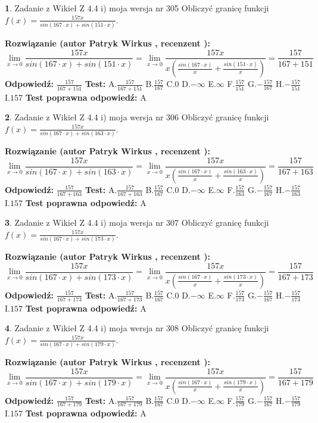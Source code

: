 \documentclass[12pt, a4paper]{article}
\theoremstyle{definition} %
\newtheorem{zad}{}
\newcommand{\zadStart}[1]{\begin{zad}#1\newline}
\newcommand{\zadStop}{\end{zad}}
\newcommand{\rozwStart}[2]{\noindent \textbf{Rozwiązanie (autor #1 , recenzent #2): }\newline}
\newcommand{\rozwStop}{\newline}
\newcommand{\odpStart}{\noindent \textbf{Odpowiedź:}\newline}
\newcommand{\odpStop}{\newline}
\newcommand{\testStart}{\noindent \textbf{Test:}\newline}
\newcommand{\testStop}{\newline}
\newcommand{\kluczStart}{\noindent \textbf{Test poprawna odpowiedź:}\newline}
\newcommand{\kluczStop}{\newline}
\begin{document}
\zadStart{Zadanie z Wikieł Z 4.4 i) moja wersja nr 305}
Obliczyć granicę funkcji $f(x)=\frac{157x}{sin(167\cdot x) +sin(151\cdot x)}$.
\zadStop
\rozwStart{Patryk Wirkus}{}
$$\lim\limits_{x\to 0}\frac{157x}{sin(167\cdot x) +sin(151\cdot x)}=\lim\limits_{x\to 0}\frac{157x}{x(\frac{sin(167\cdot x)}{x}+\frac{sin(151\cdot x)}{x})}=\frac{157}{167+151}$$
\rozwStop
\odpStart
$\frac{157}{167+151}$
\odpStop
\testStart
A.$\frac{157}{167+151}$
B.$\frac{157}{167}$
C.$0$
D.$-\infty$
E.$\infty$
F.$\frac{157}{151}$
G.$-\frac{157}{167}$
H.$-\frac{157}{151}$
I.$157$
\testStop
\kluczStart
A
\kluczStop



\zadStart{Zadanie z Wikieł Z 4.4 i) moja wersja nr 306}
Obliczyć granicę funkcji $f(x)=\frac{157x}{sin(167\cdot x) +sin(163\cdot x)}$.
\zadStop
\rozwStart{Patryk Wirkus}{}
$$\lim\limits_{x\to 0}\frac{157x}{sin(167\cdot x) +sin(163\cdot x)}=\lim\limits_{x\to 0}\frac{157x}{x(\frac{sin(167\cdot x)}{x}+\frac{sin(163\cdot x)}{x})}=\frac{157}{167+163}$$
\rozwStop
\odpStart
$\frac{157}{167+163}$
\odpStop
\testStart
A.$\frac{157}{167+163}$
B.$\frac{157}{167}$
C.$0$
D.$-\infty$
E.$\infty$
F.$\frac{157}{163}$
G.$-\frac{157}{167}$
H.$-\frac{157}{163}$
I.$157$
\testStop
\kluczStart
A
\kluczStop



\zadStart{Zadanie z Wikieł Z 4.4 i) moja wersja nr 307}
Obliczyć granicę funkcji $f(x)=\frac{157x}{sin(167\cdot x) +sin(173\cdot x)}$.
\zadStop
\rozwStart{Patryk Wirkus}{}
$$\lim\limits_{x\to 0}\frac{157x}{sin(167\cdot x) +sin(173\cdot x)}=\lim\limits_{x\to 0}\frac{157x}{x(\frac{sin(167\cdot x)}{x}+\frac{sin(173\cdot x)}{x})}=\frac{157}{167+173}$$
\rozwStop
\odpStart
$\frac{157}{167+173}$
\odpStop
\testStart
A.$\frac{157}{167+173}$
B.$\frac{157}{167}$
C.$0$
D.$-\infty$
E.$\infty$
F.$\frac{157}{173}$
G.$-\frac{157}{167}$
H.$-\frac{157}{173}$
I.$157$
\testStop
\kluczStart
A
\kluczStop



\zadStart{Zadanie z Wikieł Z 4.4 i) moja wersja nr 308}
Obliczyć granicę funkcji $f(x)=\frac{157x}{sin(167\cdot x) +sin(179\cdot x)}$.
\zadStop
\rozwStart{Patryk Wirkus}{}
$$\lim\limits_{x\to 0}\frac{157x}{sin(167\cdot x) +sin(179\cdot x)}=\lim\limits_{x\to 0}\frac{157x}{x(\frac{sin(167\cdot x)}{x}+\frac{sin(179\cdot x)}{x})}=\frac{157}{167+179}$$
\rozwStop
\odpStart
$\frac{157}{167+179}$
\odpStop
\testStart
A.$\frac{157}{167+179}$
B.$\frac{157}{167}$
C.$0$
D.$-\infty$
E.$\infty$
F.$\frac{157}{179}$
G.$-\frac{157}{167}$
H.$-\frac{157}{179}$
I.$157$
\testStop
\kluczStart
A
\kluczStop
\end{document}
